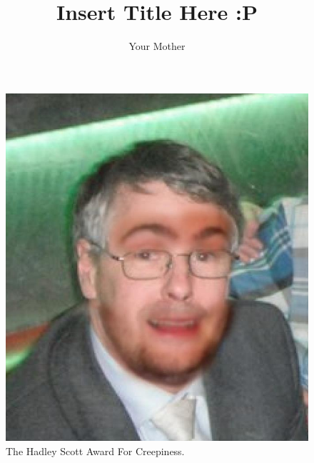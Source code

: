 \documentclass[11pt]{report}
\begin{document}
\title{Insert Title Here :P} 
\author{Your Mother}
\maketitle
\thispagestyle{empty}
\newpage


\newpage

\newpage

\newpage


\begin{figure}[h]
\begin{center}
\includegraphics[scale=0.4]{./design/542749_10151334664783073_750339761_n} 
\end{center}
\caption{The Hadley Scott Award For Creepiness.}
\label{fig:the hadley scott award for creepiness}
\end{figure} 

\newpage

\newpage

\newpage



\end{document}
